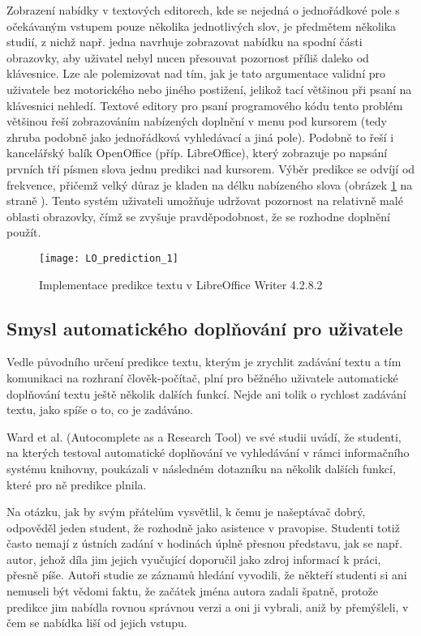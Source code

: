 \documentclass{article}
\begin{document}

Zobrazení nabídky v textových editorech, kde se nejedná o jednořádkové pole s očekávaným vstupem pouze několika jednotlivých slov, je předmětem několika studií, z nichž např. jedna navrhuje zobrazovat nabídku na spodní části obrazovky, aby uživatel nebyl nucen přesouvat pozornost příliš daleko od klávesnice. %
Lze ale polemizovat nad tím, jak je tato argumentace validní pro uživatele bez motorického nebo jiného postižení, jelikož tací většinou při psaní na klávesnici nehledí. Textové editory pro psaní programového kódu tento problém většinou řeší zobrazováním nabízených doplnění v menu pod kursorem (tedy zhruba podobně jako jednořádková vyhledávací a jiná pole). Podobně to řeší i kancelářský balík OpenOffice (příp. LibreOffice), který zobrazuje po napsání prvních tří písmen slova jednu predikci nad kursorem. Výběr predikce se odvíjí od frekvence, přičemž velký důraz je kladen na délku nabízeného slova (obrázek \ref{fig:LOpredict} na straně \pageref{fig:LOpredict}). Tento systém uživateli umožňuje udržovat pozornost na relativně malé oblasti obrazovky, čímž se zvyšuje pravděpodobnost, že se rozhodne doplnění použít. 

\begin{figure}[h]
	\caption{Implementace predikce textu v LibreOffice Writer 4.2.8.2}
	\label{fig:LOpredict}
	\centering
	\texttt{[image: LO\_prediction\_1]}
\end{figure}

\subsection{Smysl automatického doplňování pro uživatele}

Vedle původního určení predikce textu, kterým je zrychlit zadávání textu a tím komunikaci na rozhraní člověk-počítač, plní pro běžného uživatele automatické doplňování textu ještě několik dalších funkcí. Nejde ani tolik o rychlost zadávání textu, jako spíše o to, co je zadáváno. 

Ward et al. (Autocomplete as a Research Tool) ve své studii uvádí, že studenti, na kterých testoval automatické doplňování ve vyhledávání v rámci informačního systému knihovny, poukázali v následném dotazníku na několik dalších funkcí, které pro ně predikce plnila. 

Na otázku, jak by svým přátelům vysvětlil, k čemu je našeptávač dobrý, odpověděl jeden student, že rozhodně jako asistence v pravopise. Studenti totiž často nemají z ústních zadání v hodinách úplně přesnou představu, jak se např. autor, jehož díla jim jejich vyučující doporučil jako zdroj informací k práci, přesně píše. Autoři studie ze záznamů hledání vyvodili, že někteří studenti si ani nemuseli být vědomi faktu, že začátek jména autora zadali špatně, protože predikce jim nabídla rovnou správnou verzi a oni ji vybrali, aniž by přemýšleli, v čem se nabídka liší od jejich vstupu. 
\end{document}
